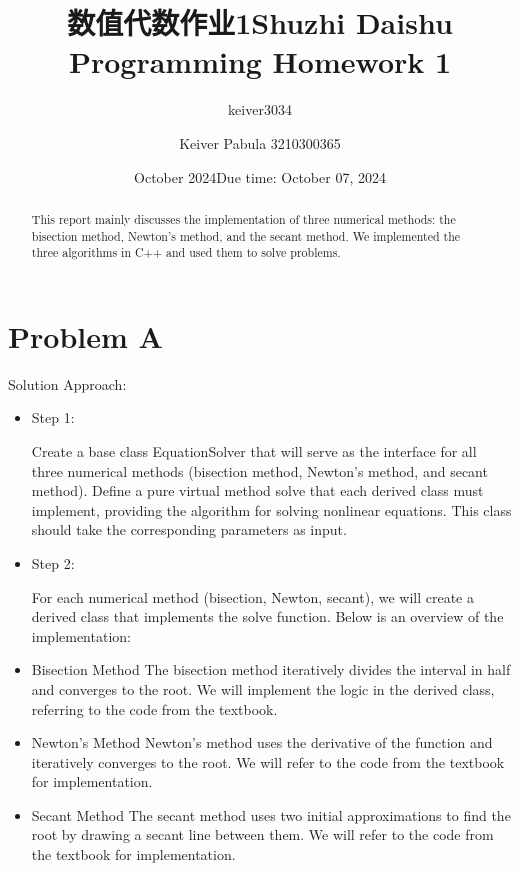 \documentclass{article}
\title{数值代数作业1}
\author{keiver3034 }
\date{October 2024}
\begin{document}
\title{Shuzhi Daishu Programming Homework 1}

\author{Keiver Pabula 3210300365}
\date{Due time: October 07, 2024}

\maketitle

\begin{abstract}
   This report mainly discusses the implementation of three numerical methods: the bisection method, Newton's method, and the secant method. We implemented the three algorithms in C++ and used them to solve problems.
\end{abstract}

\section*{Problem A}

Solution Approach:
\begin{itemize}
\item Step 1:

    Create a base class EquationSolver that will serve as the interface for all three numerical methods (bisection method, Newton's method, and secant method). Define a pure virtual method solve that each derived class must implement, providing the algorithm for solving nonlinear equations. This class should take the corresponding parameters as input.

\item Step 2:

    For each numerical method (bisection, Newton, secant), we will create a derived class that implements the solve function. Below is an overview of the implementation:

    \item Bisection Method
    The bisection method iteratively divides the interval in half and converges to the root. We will implement the logic in the derived class, referring to the code from the textbook.

    \item Newton's Method
    Newton's method uses the derivative of the function and iteratively converges to the root. We will refer to the code from the textbook for implementation.

    \item Secant Method
    The secant method uses two initial approximations to find the root by drawing a secant line between them. We will refer to the code from the textbook for implementation.
\end{itemize}
\end{document}
